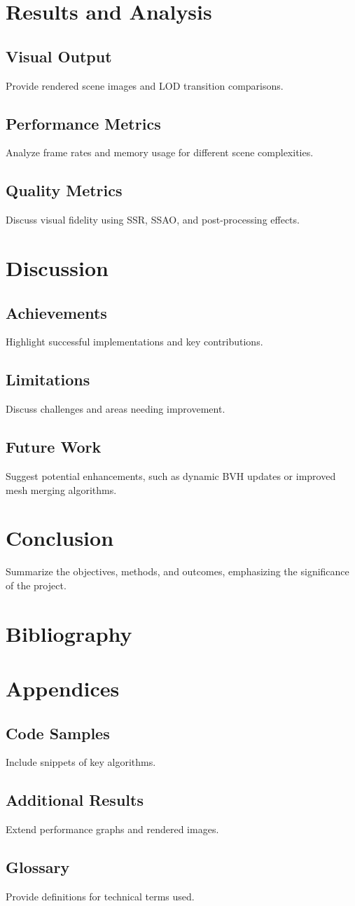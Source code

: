 \documentclass[12pt]{extarticle}
\begin{document}
\section{Results and Analysis}
\subsection{Visual Output}
Provide rendered scene images and LOD transition comparisons.
\subsection{Performance Metrics}
Analyze frame rates and memory usage for different scene complexities.
\subsection{Quality Metrics}
Discuss visual fidelity using SSR, SSAO, and post-processing effects.

\section{Discussion}
\subsection{Achievements}
Highlight successful implementations and key contributions.
\subsection{Limitations}
Discuss challenges and areas needing improvement.
\subsection{Future Work}
Suggest potential enhancements, such as dynamic BVH updates or improved mesh merging algorithms.

\section{Conclusion}
Summarize the objectives, methods, and outcomes, emphasizing the significance of the project.

\section{Bibliography}
\printbibliography

\appendix
\section{Appendices}
\subsection{Code Samples}
Include snippets of key algorithms.
\subsection{Additional Results}
Extend performance graphs and rendered images.
\subsection{Glossary}
Provide definitions for technical terms used.
\end{document}
